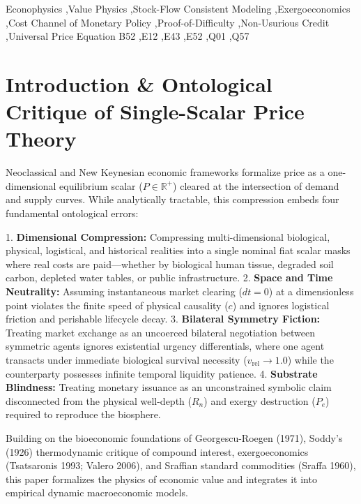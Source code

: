 \documentclass[preprint,12pt,authoryear]{elsarticle}
\theoremstyle{definition}
\begin{document}
\begin{frontmatter}
\begin{keyword}
Econophysics \sep Value Physics \sep Stock-Flow Consistent Modeling \sep Exergoeconomics \sep Cost Channel of Monetary Policy \sep Proof-of-Difficulty \sep Non-Usurious Credit \sep Universal Price Equation
\JEL B52 \sep E12 \sep E43 \sep E52 \sep Q01 \sep Q57
\end{keyword}

\end{frontmatter}

\section{Introduction \& Ontological Critique of Single-Scalar Price Theory}

Neoclassical and New Keynesian economic frameworks formalize price as a one-dimensional equilibrium scalar ($P \in \mathbb{R}^+$) cleared at the intersection of demand and supply curves. While analytically tractable, this compression embeds four fundamental ontological errors:

  

1.  \textbf{Dimensional Compression:} Compressing multi-dimensional biological, physical, logistical, and historical realities into a single nominal fiat scalar masks where real costs are paid—whether by biological human tissue, degraded soil carbon, depleted water tables, or public infrastructure.
2.  \textbf{Space and Time Neutrality:} Assuming instantaneous market clearing ($dt = 0$) at a dimensionless point violates the finite speed of physical causality ($c$) and ignores logistical friction and perishable lifecycle decay.
3.  \textbf{Bilateral Symmetry Fiction:} Treating market exchange as an uncoerced bilateral negotiation between symmetric agents ignores existential urgency differentials, where one agent transacts under immediate biological survival necessity ($v_{\text{rel}} \to 1.0$) while the counterparty possesses infinite temporal liquidity patience.
4.  \textbf{Substrate Blindness:} Treating monetary issuance as an unconstrained symbolic claim disconnected from the physical well-depth ($R_n$) and exergy destruction ($P_e$) required to reproduce the biosphere.

  

Building on the bioeconomic foundations of Georgescu-Roegen (1971), Soddy's (1926) thermodynamic critique of compound interest, exergoeconomics (Tsatsaronis 1993; Valero 2006), and Sraffian standard commodities (Sraffa 1960), this paper formalizes the physics of economic value and integrates it into empirical dynamic macroeconomic models.
\end{document}
